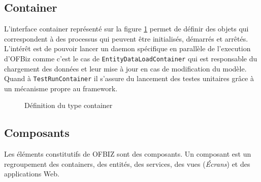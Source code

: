 \subsection{Container}
L'interface container représenté sur la figure \ref{container} permet de définir des objets qui correspondent à des processus qui peuvent être initialisés, démarrés et arrêtés. L'intérêt est de pouvoir lancer un daemon spécifique en parallèle de l'execution d'OFBiz comme c'est le cas de \verb|EntityDataLoadContainer| qui est responsable du chargement des données et leur mise à jour en cas de modification du modèle. Quand à \verb|TestRunContainer| il s'assure du lancement des testes unitaires grâce à un mécanisme propre au framework. 
\begin{figure}
	\centering
	
	
	\caption{Définition du type container}
	\label{container}
\end{figure}
\subsection{Composants}
Les éléments constitutifs de OFBIZ sont des composants. Un composant est un regroupement des containers, des entités, des services, des vues (\emph{Écrans}) et des applications Web.


